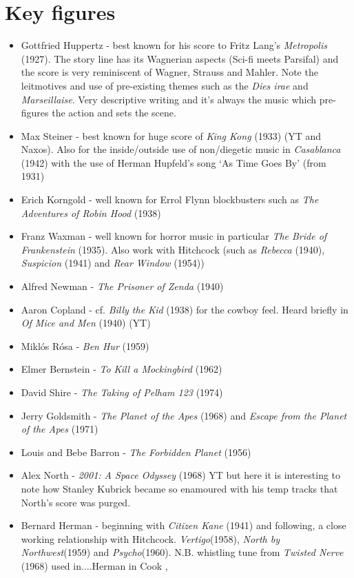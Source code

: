 \section{Key figures}
\begin{itemize}
\item Gottfried Huppertz - best known for his score to Fritz Lang's \textit{Metropolis} (1927). The story line has its Wagnerian aspects (Sci-fi meets Parsifal) and the score is very reminiscent of Wagner, Strauss and Mahler. Note the leitmotives and use of pre-existing themes such as the \textit{Dies irae} and \textit{Marseillaise}. Very descriptive writing and it's always the music which pre-figures the action and sets the scene. 
\item Max Steiner - best known for huge score of \textit{King Kong} (1933) (YT and Naxos). Also for the inside/outside use of non/diegetic music in \textit{Casablanca} (1942) with the use of Herman Hupfeld's song `As Time Goes By' (from 1931) 
\item Erich Korngold - well known for Errol Flynn blockbusters such as \textit{The Adventures of Robin Hood} (1938)
\item Franz Waxman - well known for horror music in particular \textit{The Bride of Frankenstein} (1935). Also work with Hitchcock (such as \textit{Rebecca} (1940), \textit{Suspicion} (1941) and \textit{Rear Window} (1954))
\item Alfred Newman - \textit{The Prisoner of Zenda} (1940)
\item Aaron Copland - cf. \textit{Billy the Kid} (1938) for the cowboy feel. Heard briefly in \textit{Of Mice and Men} (1940) (YT)
\item Mikl\'os R\'osa - \textit{Ben Hur} (1959)
\item Elmer Bernstein - \textit{To Kill a Mockingbird} (1962)
\item David Shire - \textit{The Taking of Pelham 123} (1974)
\item Jerry Goldsmith - \textit{The Planet of the Apes} (1968) and \textit{Escape from the Planet of the Apes} (1971)
\item Louis and Bebe Barron - \textit{The Forbidden Planet} (1956)
\item Alex North - \textit{2001: A Space Odyssey} (1968) YT but here it is interesting to note how Stanley Kubrick became so enamoured with his temp tracks that North's score was purged. 
\item Bernard Herman - beginning with \textit{Citizen Kane} (1941) and following, a close working relationship with Hitchcock. \textit{Vertigo}(1958), \textit{North by Northwest}(1959) and \textit{Psycho}(1960). N.B. whistling tune from \textit{Twisted Nerve} (1968) used in....Herman in Cook \citep[66]{cook1998analysing},

\end{itemize}
